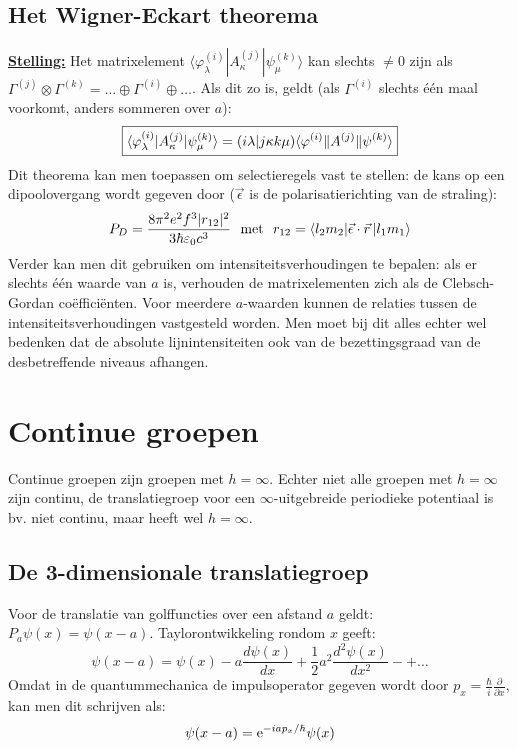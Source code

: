 \documentclass[twoside]{report}
\begin{document}
\subsection{Het Wigner-Eckart theorema}
\underline{\bf Stelling:} Het matrixelement
$\langle\varphi^{(i)}_{\lambda}|A^{(j)}_{\kappa}|\psi^{(k)}_{\mu}\rangle$ kan
slechts $\neq0$ zijn als $\Gamma^{(j)}\otimes\Gamma^{(k)}=\ldots\oplus\Gamma^{(i)}\oplus\ldots$.
Als dit zo is, geldt (als $\Gamma^{(i)}$ slechts \'e\'en maal voorkomt, anders
sommeren over $a$):
\[
\mbox{\fbox{$\displaystyle
\langle\varphi^{(i)}_{\lambda}|A^{(j)}_{\kappa}|\psi^{(k)}_{\mu}\rangle=
(i\lambda|j\kappa k\mu)\langle\varphi^{(i)}\|A^{(j)}\|\psi^{(k)}\rangle
$}}
\]
Dit theorema kan men toepassen om selectieregels vast te stellen: de kans
op een dipoolovergang wordt gegeven door ($\vec{\epsilon}$ is de polarisatierichting
van de straling):
\[
P_D=\frac{8\pi^2e^2f^3|r_{12}|^2}{3\hbar\varepsilon_0c^3}
~~\mbox{met}~~r_{12}=\langle l_2m_2|\vec{\epsilon}\cdot\vec{r}\,|l_1m_1\rangle
\]
Verder kan men dit gebruiken om intensiteitsverhoudingen te bepalen: als er
slechts \'e\'en waarde van $a$ is, verhouden de matrixelementen zich als de
Clebsch-Gordan co\"effici\"enten. Voor meerdere $a$-waarden kunnen de relaties
tussen de intensiteitsverhoudingen vastgesteld worden. Men moet bij dit alles
echter wel bedenken dat de absolute lijnintensiteiten ook van de
bezettingsgraad van de desbetreffende niveaus afhangen.

\section{Continue groepen}
Continue groepen zijn groepen met $h=\infty$. Echter niet alle groepen met
$h=\infty$ zijn continu, de translatiegroep voor een $\infty$-uitgebreide
periodieke potentiaal is bv. niet continu, maar heeft wel $h=\infty$.

\subsection{De 3-dimensionale translatiegroep}
Voor de translatie van golffuncties over een afstand $a$ geldt:
$P_a\psi(x)=\psi(x-a)$. Taylorontwikkeling rondom $x$ geeft:
\[
\psi(x-a)=\psi(x)-a\frac{d\psi(x)}{dx}+\frac{1}{2}a^2\frac{d^2\psi(x)}{dx^2}-+\ldots
\]
Omdat in de quantummechanica de impulsoperator gegeven wordt door
$\displaystyle p_x=\frac{\hbar}{i}\frac{\partial}{\partial x}$, kan men dit
schrijven als:
\[
\psi(x-a)={\rm e}^{-iap_x/\hbar}\psi(x)
\]
\end{document}
